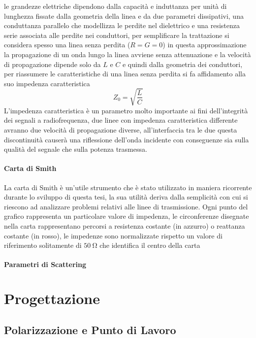 \documentclass[12pt]{article}
\begin{document}
le grandezze elettriche dipendono dalla capacità e induttanza per unità di lunghezza fissate dalla geometria della linea e da due parametri dissipativi, una conduttanza parallelo che modellizza le perdite nel dielettrico e una resistenza serie associata alle perdite nei conduttori, per semplificare la trattazione si considera spesso una linea senza perdita ($R=G=0$) in questa approssimazione la propagazione di un onda lungo la linea avviene senza attenuazione e la velocità di propagazione dipende solo da $L$ e $C$ e quindi dalla geometria dei conduttori, per riassumere le caratteristiche di una linea senza perdita si fa affidamento alla suo impedenza caratteristica
\begin{equation}
    Z_0=\sqrt{\dfrac{L}{C}}
\end{equation}
L'impedenza caratteristica è un parametro molto importante ai fini dell'integrità dei segnali a radiofrequenza, due linee con impedenza caratteristica differente avranno due velocità di propagazione diverse, all'interfaccia tra le due questa discontinuità causerà una riflessione dell'onda incidente con conseguenze sia sulla qualità del segnale che sulla potenza trasmessa.

\paragraph{Carta di Smith}
La carta di Smith è un'utile strumento che è stato utilizzato in maniera ricorrente durante lo sviluppo di questa tesi, la sua utilità deriva dalla semplicità con cui si riescono ad analizzare problemi relativi alle linee di trasmissione.
Ogni punto del grafico rappresenta un particolare valore di impedenza, le circonferenze disegnate nella carta rappresentano percorsi a resistenza costante (in azzurro) o reattanza costante (in rosso), le impedenze sono normalizzate rispetto un valore di riferimento solitamente di $\SI{50}{\ohm}$ che identifica il centro della carta

\paragraph{Parametri di Scattering}

\section{Progettazione}
\subsection{Polarizzazione e Punto di Lavoro}
\end{document}
